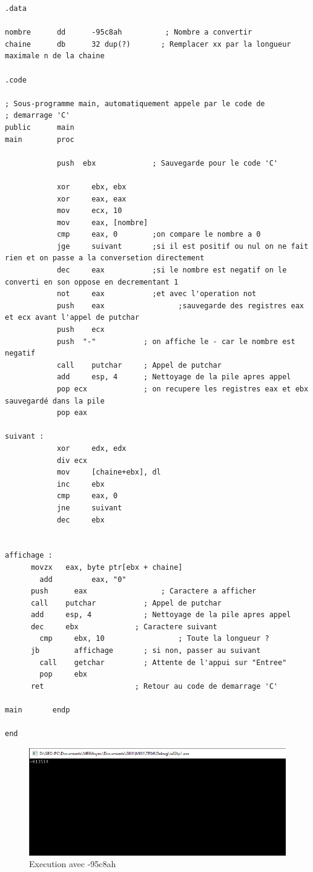 \documentclass[11pt]{report}
\begin{document}
\begin{lstlisting}
.data

nombre      dd      -95c8ah          ; Nombre a convertir
chaine      db      32 dup(?)       ; Remplacer xx par la longueur maximale n de la chaine

.code

; Sous-programme main, automatiquement appele par le code de
; demarrage 'C'
public      main
main        proc

			push  ebx             ; Sauvegarde pour le code 'C'

			xor		ebx, ebx
			xor		eax, eax
			mov		ecx, 10
			mov		eax, [nombre]
			cmp 	eax, 0        ;on compare le nombre a 0
			jge 	suivant       ;si il est positif ou nul on ne fait rien et on passe a la conversetion directement
			dec 	eax           ;si le nombre est negatif on le converti en son oppose en decrementant 1
			not 	eax           ;et avec l'operation not
			push 	eax				    ;sauvegarde des registres eax et ecx avant l'appel de putchar
			push	ecx
			push  "-"           ; on affiche le - car le nombre est negatif
			call    putchar     ; Appel de putchar
			add     esp, 4      ; Nettoyage de la pile apres appel
			pop ecx             ; on recupere les registres eax et ebx sauvegardé dans la pile
			pop eax

suivant :
			xor 	edx, edx
			div	ecx
			mov		[chaine+ebx], dl
			inc		ebx
			cmp		eax, 0
			jne		suivant
			dec		ebx


affichage :
      movzx   eax, byte ptr[ebx + chaine]
	    add			eax, "0"
      push   	eax         		; Caractere a afficher
      call    putchar     		; Appel de putchar
      add     esp, 4      		; Nettoyage de la pile apres appel
  	  dec     ebx             ; Caractere suivant
	    cmp     ebx, 10 				; Toute la longueur ?
      jb     	affichage       ; si non, passer au suivant
	    call    getchar         ; Attente de l'appui sur "Entree"
	    pop     ebx
      ret                     ; Retour au code de demarrage 'C'

main       endp

end
\end{lstlisting}

\begin{figure}[ht]
\includegraphics[width=12cm]{Capture7.PNG}
\caption{Execution avec -95c8ah}
\end{figure}
\end{document}
